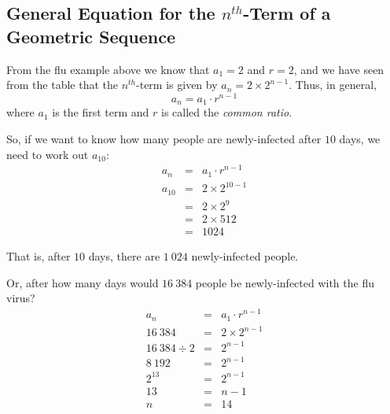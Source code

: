 
\subsection{General Equation for the $n^{th}$-Term of a Geometric Sequence}

From the flu example above we know that $a_1 = 2$ and $r = 2$, and we have seen from the table that the
$n^{th}$-term is given by $a_n = 2 \times 2^{n-1}$. Thus, in general,
\begin{equation}
a_n = a_1 \cdot r^{n-1}
\end{equation}
where $a_1$ is the first term and $r$ is called the \textit{common ratio}. 

So, if we want to know how many people are newly-infected after $10$ days, we need to work
out $a_{10}$:
\begin{eqnarray*}
a_n &=& a_1 \cdot r^{n-1} \\
a_{10} &=& 2 \times 2^{10-1} \\
&=& 2 \times 2^9 \\
&=& 2 \times 512 \\
&=& 1024
\end{eqnarray*}

That is, after $10$ days, there are $1~024$ newly-infected people.

Or, after how many days would $16~384$ people be newly-infected with the flu virus?
\begin{eqnarray*}
a_n &=& a_1 \cdot r^{n-1} \\
16~384 &=& 2 \times 2^{n-1} \\
16~384 \div 2 &=& 2^{n-1} \\
8~192 &=& 2^{n-1} \\
2^{13} &=& 2^{n-1} \\
13 &=& n - 1 \\
n &=& 14
\end{eqnarray*}

